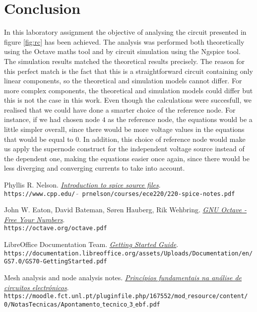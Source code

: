 \section{Conclusion}
\label{sec:conclusion}

In this laboratory assignment the objective of analysing the circuit presented
in figure \ref{fig:rc} has been achieved. The analysis was performed both theoretically
using the Octave maths tool and by circuit simulation using the Ngspice tool.
The simulation results matched the theoretical results precisely.
The reason for this perfect match is the fact that this is a
straightforward circuit containing only linear components, so the theoretical
and simulation models cannot differ. For more complex components, the
theoretical and simulation models could differ but this is not the case in this
work. Even though the calculations were succesfull, we realised that we could have 
done a smarter choice of the reference node. For instance, if we had chosen node $4$ as the reference node, 
the equations would be a little simpler overall, since there would be more voltage values in the equations that would 
be equal to $0$. In addition, this choice of reference node would make us apply the supernode construct for the independent 
voltage source instead of the dependent one, making the equations easier once again, since there would be less diverging and 
converging currents to take into account.

\begin{thebibliography}{9}

    Phyllis R. Nelson.
    \textit{\href{https://www.cpp.edu/~prnelson/courses/ece220/220-spice-notes.pdf}{Introduction to \emph{spice} source files}}.
    \\\texttt{https://www.cpp.edu/ $\tilde{}$ prnelson/courses/ece220/220-spice-notes.pdf}


    John W. Eaton, David Bateman, Søren Hauberg, Rik Wehbring.
    \textit{\href{https://octave.org/octave.pdf}{GNU Octave - Free Your Numbers}}.
    \\\texttt{https://octave.org/octave.pdf}

    LibreOffice Documentation Team.
    \textit{\href{https://documentation.libreoffice.org/assets/Uploads/Documentation/en/GS7.0/GS70-GettingStarted.pdf}{Getting Started Guide}}.
    \\\texttt{https://documentation.libreoffice.org/assets/Uploads/Documentation/en/
        GS7.0/GS70-GettingStarted.pdf}

    Mesh analysis and node analysis notes.
    \textit{\href{https://moodle.fct.unl.pt/pluginfile.php/167552/mod_resource/content/0/NotasTecnicas/Apontamento_tecnico_3_ebf.pdf}{Princípios fundamentais na análise de circuitos electrónicos}}.
    \\\texttt{https://moodle.fct.unl.pt/pluginfile.php/167552/mod$\_$resource/content/
        0/NotasTecnicas/Apontamento$\_$tecnico$\_$3$\_$ebf.pdf}

\end{thebibliography}
